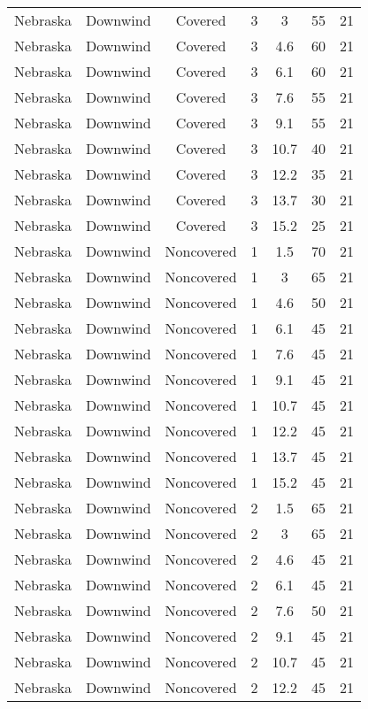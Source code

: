 \documentclass{article}
\begin{document}
\begin{longtable}[H]{ccccccc}
Nebraska & Downwind & Covered     & 3 & 3    & 55 & 21 \\
Nebraska & Downwind & Covered     & 3 & 4.6  & 60 & 21 \\
Nebraska & Downwind & Covered     & 3 & 6.1  & 60 & 21 \\
Nebraska & Downwind & Covered     & 3 & 7.6  & 55 & 21 \\
Nebraska & Downwind & Covered     & 3 & 9.1  & 55 & 21 \\
Nebraska & Downwind & Covered     & 3 & 10.7 & 40 & 21 \\
Nebraska & Downwind & Covered     & 3 & 12.2 & 35 & 21 \\
Nebraska & Downwind & Covered     & 3 & 13.7 & 30 & 21 \\
Nebraska & Downwind & Covered     & 3 & 15.2 & 25 & 21 \\
Nebraska & Downwind & Noncovered & 1 & 1.5  & 70 & 21 \\
Nebraska & Downwind & Noncovered & 1 & 3    & 65 & 21 \\
Nebraska & Downwind & Noncovered & 1 & 4.6  & 50 & 21 \\
Nebraska & Downwind & Noncovered & 1 & 6.1  & 45 & 21 \\
Nebraska & Downwind & Noncovered & 1 & 7.6  & 45 & 21 \\
Nebraska & Downwind & Noncovered & 1 & 9.1  & 45 & 21 \\
Nebraska & Downwind & Noncovered & 1 & 10.7 & 45 & 21 \\
Nebraska & Downwind & Noncovered & 1 & 12.2 & 45 & 21 \\
Nebraska & Downwind & Noncovered & 1 & 13.7 & 45 & 21 \\
Nebraska & Downwind & Noncovered & 1 & 15.2 & 45 & 21 \\
Nebraska & Downwind & Noncovered & 2 & 1.5  & 65 & 21 \\
Nebraska & Downwind & Noncovered & 2 & 3    & 65 & 21 \\
Nebraska & Downwind & Noncovered & 2 & 4.6  & 45 & 21 \\
Nebraska & Downwind & Noncovered & 2 & 6.1  & 45 & 21 \\
Nebraska & Downwind & Noncovered & 2 & 7.6  & 50 & 21 \\
Nebraska & Downwind & Noncovered & 2 & 9.1  & 45 & 21 \\
Nebraska & Downwind & Noncovered & 2 & 10.7 & 45 & 21 \\
Nebraska & Downwind & Noncovered & 2 & 12.2 & 45 & 21 \\

\end{longtable}
\end{document}
